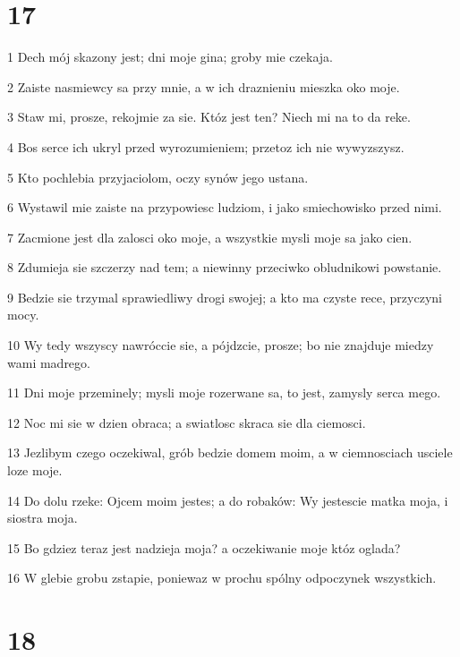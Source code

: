 \chapter{17}

\par 1 Dech mój skazony jest; dni moje gina; groby mie czekaja.
\par 2 Zaiste nasmiewcy sa przy mnie, a w ich draznieniu mieszka oko moje.
\par 3 Staw mi, prosze, rekojmie za sie. Któz jest ten? Niech mi na to da reke.
\par 4 Bos serce ich ukryl przed wyrozumieniem; przetoz ich nie wywyzszysz.
\par 5 Kto pochlebia przyjaciolom, oczy synów jego ustana.
\par 6 Wystawil mie zaiste na przypowiesc ludziom, i jako smiechowisko przed nimi.
\par 7 Zacmione jest dla zalosci oko moje, a wszystkie mysli moje sa jako cien.
\par 8 Zdumieja sie szczerzy nad tem; a niewinny przeciwko obludnikowi powstanie.
\par 9 Bedzie sie trzymal sprawiedliwy drogi swojej; a kto ma czyste rece, przyczyni mocy.
\par 10 Wy tedy wszyscy nawróccie sie, a pójdzcie, prosze; bo nie znajduje miedzy wami madrego.
\par 11 Dni moje przeminely; mysli moje rozerwane sa, to jest, zamysly serca mego.
\par 12 Noc mi sie w dzien obraca; a swiatlosc skraca sie dla ciemosci.
\par 13 Jezlibym czego oczekiwal, grób bedzie domem moim, a w ciemnosciach usciele loze moje.
\par 14 Do dolu rzeke: Ojcem moim jestes; a do robaków: Wy jestescie matka moja, i siostra moja.
\par 15 Bo gdziez teraz jest nadzieja moja? a oczekiwanie moje któz oglada?
\par 16 W glebie grobu zstapie, poniewaz w prochu spólny odpoczynek wszystkich.

\chapter{18}

